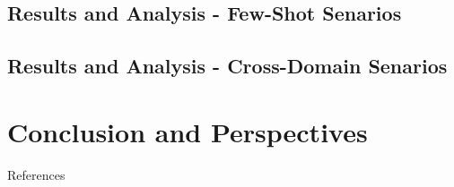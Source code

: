 \documentclass[xcolor=table, 8pt]{beamer}
\begin{document}
    \subsection{Results and Analysis - Few-Shot Senarios}
    

    

    \subsection{Results and Analysis - Cross-Domain Senarios}
    
%
%
%
    \section{Conclusion and Perspectives}
    


    \begin{frame}[allowframebreaks=]{References}
        \printbibliography
    \end{frame}
\end{document}
